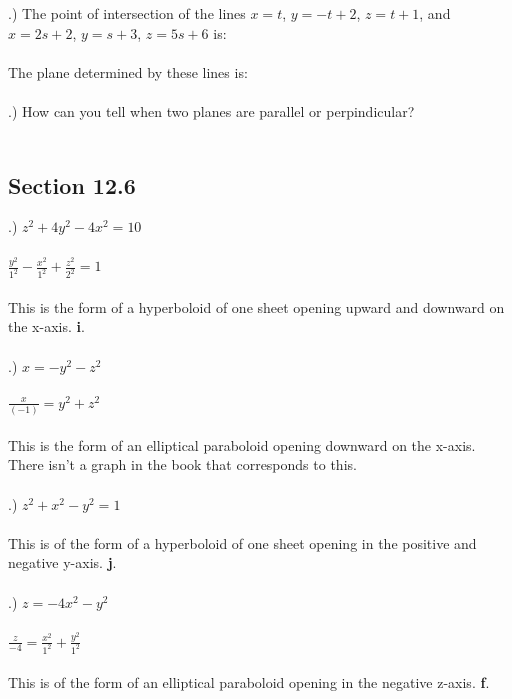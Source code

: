 \documentclass[12pt]{article}
\begin{document}
\noindnet 
{}.) The point of intersection of the lines $x = t$, \hspace{10pt} $y = -t+2$, \hspace{10pt} $z = t + 1$, \hspace{10pt}
and $x = 2s+2$, \hspace{10pt} $y = s+3$, \hspace{10pt} $z = 5s+6$ is:\\\\
The plane determined by these lines is:\\\\
.) How can you tell when two planes are parallel or perpindicular? \\\\
\noindent 
\subsection*{Section 12.6}
.) $z^{2}+4y^{2}-4x^{2}=10$\\\\
\noindent $\frac{y^{2}}{1^{2}} - \frac{x^{2}}{1^{2}} + \frac{z^{2}}{2^{2}} = 1$\\\\
\noindent This is the form of a hyperboloid of one sheet opening upward and downward on the
 x-axis. \textbf{i}.\\\\
.) $x=-y^{2}-z^{2}$\\\\
\noindent $\frac{x}{(-1)} = y^{2} + z^{2}$\\\\
\noindent This is the form of an elliptical paraboloid opening downward on the x-axis. There isn't a graph in the book that corresponds to this.\\\\
.) $z^{2}+x^{2}-y^{2}=1$\\\\
This is of the form of a hyperboloid of one sheet opening in the positive and negative y-axis. \textbf{j}.\\\\
.) $z=-4x^{2} -y^{2}$\\\\
\noindent $\frac{z}{-4} = \frac{x^{2}}{1^{2}} + \frac{y^{2}}{1^{2}}$\\\\
\noindent This is of the form of an elliptical paraboloid opening in the negative z-axis. \textbf{f}.\\\\
\end{document}
